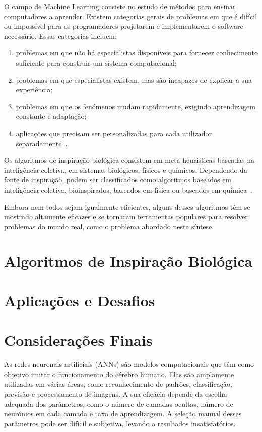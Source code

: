 \documentclass[conference]{IEEEtran}
\begin{document}
    O campo de Machine Learning consiste no estudo de métodos para ensinar computadores a aprender.
    Existem categorias gerais de problemas em que é difícil ou impossível para os programadores projetarem e implementarem o software necessário.
    Essas categorias incluem:
    \begin{enumerate}
        \item problemas em que não há especialistas disponíveis para fornecer conhecimento suficiente para construir um sistema computacional;
        \item problemas em que especialistas existem, mas são incapazes de explicar a sua experiência;
        \item problemas em que os fenómenos mudam rapidamente, exigindo aprendizagem constante e adaptação;
        \item aplicações que precisam ser personalizadas para cada utilizador separadamente~\cite{Mitchell1996}.
    \end{enumerate}

    Os algoritmos de inspiração biológica consistem em meta-heurísticas baseadas na inteligência coletiva, em sistemas biológicos, físicos e químicos.
    Dependendo da fonte de inspiração, podem ser classificados como algoritmos baseados em inteligência coletiva, bioinspirados, baseados em física ou baseados em química~\cite{Fister2013AOptimization}.

    Embora nem todos sejam igualmente eficientes, alguns desses algoritmos têm se mostrado altamente eficazes e se tornaram ferramentas populares para resolver problemas do mundo real, como o problema abordado nesta síntese.


    \section{Algoritmos de Inspiração Biológica}\label{sec:algoritmos}
    


    \section{Aplicações e Desafios}\label{sec:aplicacoes}
    


    \section{Considerações Finais}\label{sec:conclusao}

    As redes neuronais artificiais (ANNs) são modelos computacionais que têm como objetivo imitar o funcionamento do cérebro humano.
    Elas são amplamente utilizadas em várias áreas, como reconhecimento de padrões, classificação, previsão e processamento de imagens.
    A sua eficácia depende da escolha adequada dos parâmetros, como o número de camadas ocultas, número de neurónios em cada camada e taxa de aprendizagem.
    A seleção manual desses parâmetros pode ser difícil e subjetiva, levando a resultados insatisfatórios.
\end{document}
